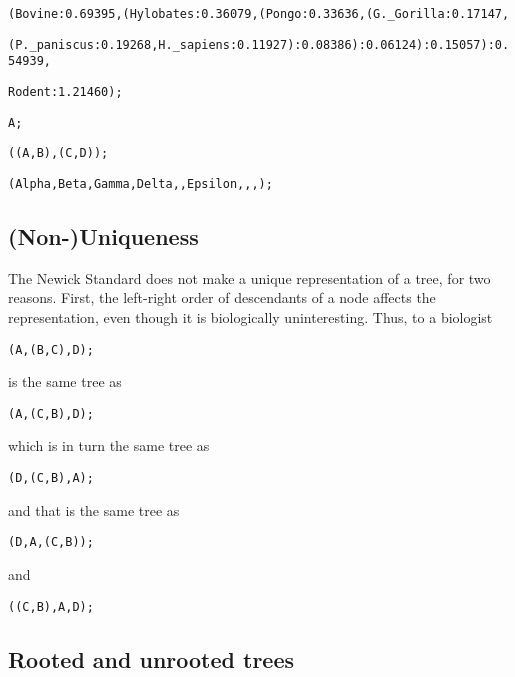 \noindent
\begin{adjustbox}{center}
\texttt{(Bovine:0.69395,(Hylobates:0.36079,(Pongo:0.33636,(G.\_Gorilla:0.17147,}
\end{adjustbox}
\begin{adjustbox}{center}
\texttt{(P.\_paniscus:0.19268,H.\_sapiens:0.11927):0.08386):0.06124):0.15057):0.54939,}
\end{adjustbox}
\noindent \texttt{Rodent:1.21460);}

\bigskip

\texttt{A;}

\bigskip

\texttt{((A,B),(C,D));}

\bigskip

\texttt{(Alpha,Beta,Gamma,Delta,,Epsilon,,,);}

\hypertarget{non-uniqueness}{%
\subsection*{(Non-)Uniqueness}\label{non-uniqueness}}

The Newick Standard does not make a unique representation of a tree, for
two reasons. First, the left-right order of descendants of a node
affects the representation, even though it is biologically
uninteresting. Thus, to a biologist

\bigskip

\texttt{(A,(B,C),D);}

\bigskip

is the same tree as

\bigskip

\texttt{(A,(C,B),D);}

\bigskip

which is in turn the same tree as

\bigskip

\texttt{(D,(C,B),A);}

\bigskip

and that is the same tree as

\bigskip

\texttt{(D,A,(C,B));}

\bigskip

and

\bigskip

\texttt{((C,B),A,D);}

\hypertarget{rooted-and-unrooted-trees}{%
\subsection*{Rooted and unrooted trees}\label{rooted-and-unrooted-trees}}

